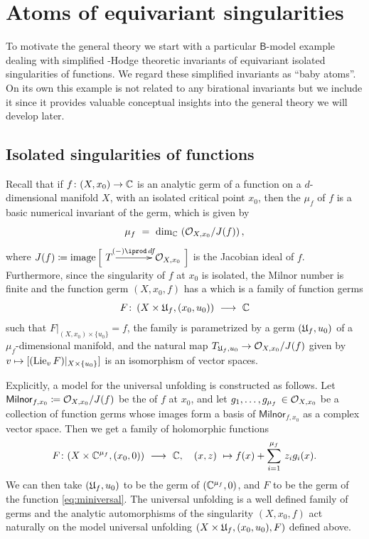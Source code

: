 \documentclass[twoside,leqno]{article}
\numberwithin{equation}{section}
\theoremstyle{plain}
\theoremstyle{definition}
\begin{document}




\section{Atoms of equivariant singularities} \label{sec:Bmodel}

To motivate the general theory we start with a particular $\mathsf{B}$-model example dealing with  simplified  \nc-Hodge theoretic invariants of equivariant isolated singularities of functions. We  regard these simplified invariants as ``baby atoms''. On its own this example is not related to any birational invariants but we include it since it provides valuable conceptual insights into the general theory we will develop later.

\subsection{Isolated singularities of functions} \label{ssec:fx0}

Recall that if $f \colon (X,x_{0}) \to \mathbb C$ is an analytic germ of a function on a $d$-dimensional manifold $X$, with an isolated critical point $x_{0}$, then the  $\mu_{f}$ of $f$ is a basic numerical invariant of the germ, which is given by 
\[
\mu_{f} \ = \ \dim_{\mathbb C} \, \left( \mathcal O_{X,x_{0}}/J(f)\right),
\]
where $J(f) \coloneqq \op{image}\Big[\xymatrix@1@C+1pc@M+0.2pc{T \ar[r]^-{(-)\iprod \, df} & \cO_{X,x_{0}}}\Big]$ is the Jacobian ideal of $f$. Furthermore, since the singularity of $f$ at $x_{0}$ is isolated, the Milnor number is finite and the function germ $(X,x_{0},f)$ has a  which is a family of function germs
\[
F \colon \left(X\times \univ_{f},(x_{0},u_{0})\right) \ \longrightarrow \ \bbC
\]
such that $F|_{(X,x_{0})\times\{u_{0}\}} = f$, the family is parametrized by a germ $(\mathfrak{U}_{f},u_{0})$ of a $\mu_{f}$-dimensional manifold, and the natural map 
$T_{\mathfrak{U}_{f},u_{0}} \to \mathcal O_{X,x_{0}}/J(f)$ given by $v \mapsto [(\operatorname{Lie}_{v}F)|_{X\times \{u_{0}\}}]$ is an isomorphism of vector spaces.

Explicitly, a model for the universal unfolding is constructed as follows. Let
$\mathsf{Milnor}_{f,x_{0}} \coloneqq \mathcal O_{X,x_{0}}/J(f)$ be the    of $f$ at $x_{0}$, and let 
$g_{1}, \ldots, g_{\mu_{f}} \, \in \mathcal O_{X,x_{0}}$ be a collection of function germs whose images form a basis of $\mathsf{Milnor}_{f,x_{0}}$ as a complex vector space. Then we get a family of holomorphic functions 
\begin{equation} \label{eq:miniversal}
F \colon (X\times \mathbb C^{\mu_{f}}, (x_{0},0)) \ \longrightarrow \ \mathbb C, \quad (x,z) \ \mapsto 
f(x) + \sum_{i=1}^{\mu_{f}} \, z_{i}g_{i}(x).
\end{equation}
We can then take $(\mathfrak{U}_{f},u_{0})$ to be the germ of $(\mathbb C^{\mu_{f}},0)$, and $F$ to be the germ of the function \eqref{eq:miniversal}.  The universal unfolding is a well defined family of germs and the analytic automorphisms of the singularity $(X,x_{0},f)$ act naturally on the  model universal unfolding $(X\times \mathfrak{U}_{f}, (x_{0},u_{0}),F)$ defined above. 
\end{document}

